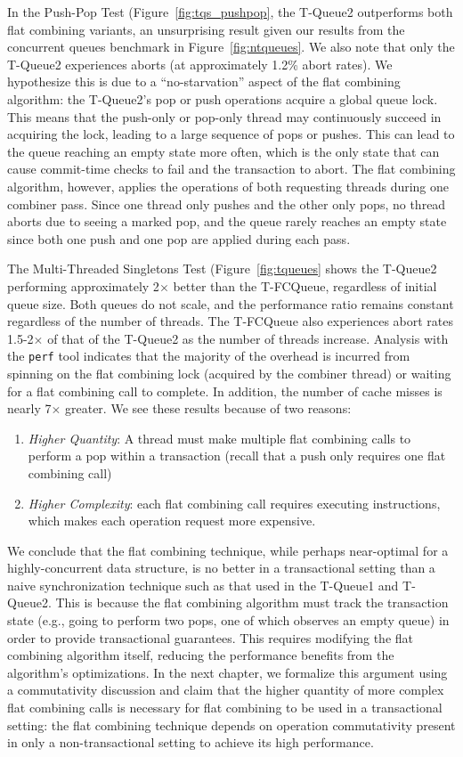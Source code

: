 In the Push-Pop Test (Figure~\ref{fig:tqs_pushpop}, the T-Queue2 outperforms both flat combining variants, an unsurprising result given our results from the concurrent queues benchmark in Figure~\ref{fig:ntqueues}. We also note that only the T-Queue2 experiences aborts (at approximately 1.2\% abort rates). We hypothesize this is due to a ``no-starvation'' aspect of the flat combining algorithm: the T-Queue2's pop or push operations acquire a global queue lock. This means that the push-only or pop-only thread may continuously succeed in acquiring the lock, leading to a large sequence of pops or pushes. This can lead to the queue reaching an empty state more often, which is the only state that can cause commit-time checks to fail and the transaction to abort. The flat combining algorithm, however, applies the operations of both requesting threads during one combiner pass. Since one thread only pushes and the other only pops, no thread aborts due to seeing a marked pop, and the queue rarely reaches an empty state since both one push and one pop are applied during each pass.

The Multi-Threaded Singletons Test (Figure~\ref{fig:tqueues} shows the T-Queue2 performing approximately 2$\times$ better than the T-FCQueue, regardless of initial queue size. Both queues do not scale, and the performance ratio remains constant regardless of the number of threads. The T-FCQueue also experiences abort rates 1.5-2$\times$ of that of the T-Queue2 as the number of threads increase.
Analysis with the \texttt{perf} tool indicates that the majority of the overhead is incurred from spinning on the flat combining lock (acquired by the combiner thread) or waiting for a flat combining call to complete. In addition, the number of cache misses is nearly 7$\times$ greater. We see these results because of two reasons:
\begin{enumerate}
\item \emph{Higher Quantity}: A thread must make multiple flat combining calls to perform a pop within a transaction (recall that a push only requires one flat combining call) 
\item \emph{Higher Complexity}: each flat combining call requires executing instructions, which makes each operation request more expensive.
\end{enumerate}

We conclude that the flat combining technique, while perhaps near-optimal for a highly-concurrent data structure, is no better in a transactional setting than a naive synchronization technique such as that used in the T-Queue1 and T-Queue2. This is because the flat combining algorithm must track the transaction state (e.g., going to perform two pops, one of which observes an empty queue) in order to provide transactional guarantees. This requires modifying the flat combining algorithm itself, reducing the performance benefits from the algorithm's optimizations. In the next chapter, we formalize this argument using a commutativity discussion and claim that the higher quantity of more complex flat combining calls is necessary for flat combining to be used in a transactional setting: the flat combining technique depends on operation commutativity present in only a non-transactional setting to achieve its high performance. 
